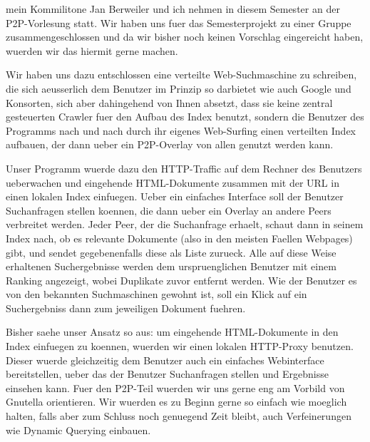 
mein Kommilitone Jan Berweiler und ich nehmen in diesem Semester an der
P2P-Vorlesung statt.  Wir haben uns fuer das Semesterprojekt zu einer Gruppe
zusammengeschlossen und da wir bisher noch keinen Vorschlag eingereicht haben,
wuerden wir das hiermit gerne machen.

Wir haben uns dazu entschlossen eine verteilte Web-Suchmaschine zu schreiben,
die sich aeusserlich dem Benutzer im Prinzip so darbietet wie auch Google und
Konsorten, sich aber dahingehend von Ihnen absetzt, dass sie keine zentral
gesteuerten Crawler fuer den Aufbau des Index benutzt, sondern die Benutzer des
Programms nach und nach durch ihr eigenes Web-Surfing einen verteilten Index
aufbauen, der dann ueber ein P2P-Overlay von allen genutzt werden kann.

Unser Programm wuerde dazu den HTTP-Traffic auf dem Rechner des Benutzers
ueberwachen und eingehende HTML-Dokumente zusammen mit der URL in einen lokalen
Index einfuegen.  Ueber ein einfaches Interface soll der Benutzer Suchanfragen
stellen koennen, die dann ueber ein Overlay an andere Peers verbreitet werden.
Jeder Peer, der die Suchanfrage erhaelt, schaut dann in seinem Index nach, ob
es relevante Dokumente (also in den meisten Faellen Webpages) gibt, und sendet
gegebenenfalls diese als Liste zurueck.  Alle auf diese Weise erhaltenen
Suchergebnisse werden dem urspruenglichen Benutzer mit einem Ranking angezeigt,
wobei Duplikate zuvor entfernt werden.  Wie der Benutzer es von den bekannten
Suchmaschinen gewohnt ist, soll ein Klick auf ein Suchergebniss dann zum
jeweiligen Dokument fuehren.

Bisher saehe unser Ansatz so aus: um eingehende HTML-Dokumente in den Index
einfuegen zu koennen, wuerden wir einen lokalen HTTP-Proxy benutzen.  Dieser
wuerde gleichzeitig dem Benutzer auch ein einfaches Webinterface bereitstellen,
ueber das der Benutzer Suchanfragen stellen und Ergebnisse einsehen kann.  Fuer
den P2P-Teil wuerden wir uns gerne eng am Vorbild von Gnutella orientieren.
Wir wuerden es zu Beginn gerne so einfach wie moeglich halten, falls aber zum
Schluss noch genuegend Zeit bleibt, auch Verfeinerungen wie Dynamic Querying
einbauen. 
